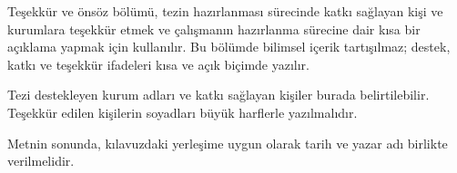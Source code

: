 Teşekkür ve önsöz bölümü, tezin hazırlanması sürecinde katkı sağlayan
kişi ve kurumlara teşekkür etmek ve çalışmanın hazırlanma sürecine dair
kısa bir açıklama yapmak için kullanılır. Bu bölümde bilimsel içerik
tartışılmaz; destek, katkı ve teşekkür ifadeleri kısa ve açık biçimde
yazılır.

Tezi destekleyen kurum adları ve katkı sağlayan kişiler burada
belirtilebilir. Teşekkür edilen kişilerin soyadları büyük
harflerle yazılmalıdır.

Metnin sonunda, kılavuzdaki yerleşime uygun olarak tarih ve
yazar adı birlikte verilmelidir.
